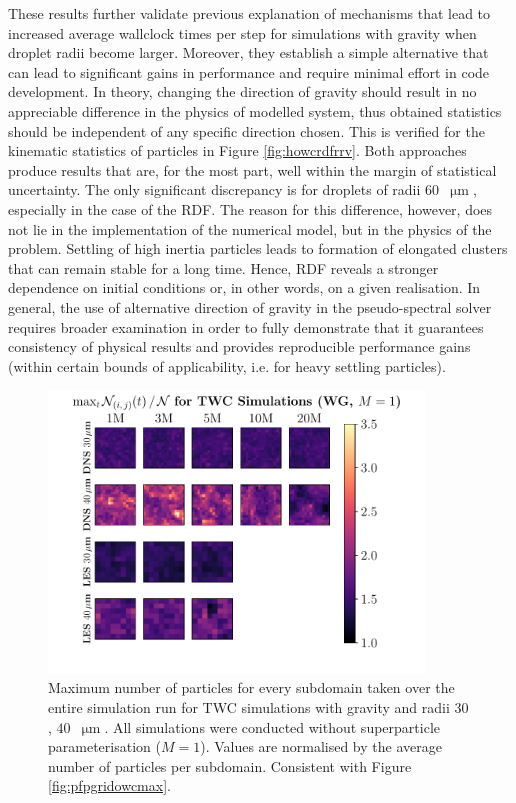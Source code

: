 \documentclass{pracamgren}
\begin{document}
These results further validate previous explanation of mechanisms that lead to increased average wallclock times per step for simulations with gravity when droplet radii become larger.
Moreover, they establish a simple alternative that can lead to significant gains in performance and require minimal effort in code development.
In theory, changing the direction of gravity should result in no appreciable difference in the physics of modelled system, thus obtained statistics should be independent of any specific direction chosen.
This is verified for the kinematic statistics of particles in Figure \ref{fig:howcrdfrrv}.
Both approaches produce results that are, for the most part, well within the margin of statistical uncertainty.
The only significant discrepancy is for droplets of radii $60$~$\upmu\text{m}$, especially in the case of the RDF.
The reason for this difference, however, does not lie in the implementation of the numerical model, but in the physics of the problem.
Settling of high inertia particles leads to formation of elongated clusters that can remain stable for a long time.
Hence, RDF reveals a stronger dependence on initial conditions or, in other words, on a given realisation.
In general, the use of alternative direction of gravity in the pseudo-spectral solver requires broader examination in order to fully demonstrate that it guarantees consistency of physical results and provides reproducible performance gains (within certain bounds of applicability, i.e. for heavy settling particles).

\begin{figure}[!h]
\centering
\includegraphics[width=10cm]{img/plots/3-4i-pfpgridtwcmax.pdf}
\caption{
Maximum number of particles for every subdomain taken over the entire simulation run for TWC simulations with gravity and radii $30$, $40$~$\upmu\text{m}$.
All simulations were conducted without superparticle parameterisation ($M=1$). 
Values are normalised by the average number of particles per subdomain.
Consistent with Figure \ref{fig:pfpgridowcmax}.
}
\label{fig:pfpgridtwcmax}
\end{figure}
\end{document}
